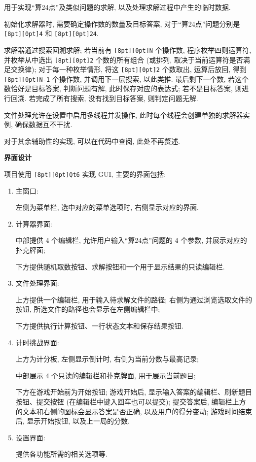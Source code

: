 \documentclass{ctexart}
\newcommand{\subtitletext}[1]{{\fontsize{16}{16} \textbf{#1} \vspace*{1ex}}}
\newcommand{\codebox}[1]{\colorbox[rgb]{0.9, 0.9, 0.9}{\texttt{\raisebox{0pt}[8pt][0pt]{#1}}}}
\begin{document}
\begin{enumerate}[itemindent=0pt, leftmargin=14pt]
    用于实现“算24点”及类似问题的求解, 以及处理求解过程中产生的临时数据.

    初始化求解器时, 需要确定操作数的数量及目标答案, 对于“算24点”问题分别是 \codebox{4} 和 \codebox{24}.

    求解器通过搜索回溯求解; 若当前有 \codebox{N} 个操作数, 程序枚举四则运算符, 
    并枚举从中选出 \codebox{2} 个数的所有组合 (或排列, 取决于当前运算符是否满足交换律);
    对于每一种枚举情形, 将这 \codebox{2} 个数取出, 运算后放回, 得到 \codebox{N-1} 个操作数,
    并调用下一层搜索, 以此类推. 最后剩下一个数, 若这个数恰好是目标答案, 判断问题有解, 此时保存对应的表达式; 若不是目标答案, 则进行回溯.
    若完成了所有搜索, 没有找到目标答案, 则判定问题无解.

    文件处理允许在设置中启用多线程并发操作, 此时每个线程会创建单独的求解器实例, 确保数据互不干扰.
    
    
\end{enumerate}

对于其余辅助性的实现, 可以在代码中查阅, 此处不再赘述.

\vspace*{4ex}

\subtitletext{界面设计}

项目使用 \codebox{Qt6} 实现 GUI, 主要的界面包括:

\begin{enumerate}[itemindent=0pt, leftmargin=14pt]

    \item 主窗口:
    
    左侧为菜单栏, 选中对应的菜单选项时, 右侧显示对应的界面.

    \item 计算器界面:
    
    中部提供 4 个编辑栏, 允许用户输入“算24点”问题的 4 个参数, 并展示对应的扑克牌面;

    下方提供随机取数按钮、求解按钮和一个用于显示结果的只读编辑栏.

    \item 文件处理界面:
    
    上方提供一个编辑栏, 用于输入待求解文件的路径; 右侧为通过浏览选取文件的按钮, 所选文件的路径也会显示在左侧编辑栏中;

    下方提供执行计算按钮、一行状态文本和保存结果按钮.

    \item 计时挑战界面:
    
    上方为计分板, 左侧显示倒计时, 右侧为当前分数与最高记录;

    中部展示 4 个只读的编辑栏和扑克牌面, 用于展示当前题目;

    下方在游戏开始前为开始按钮;
    游戏开始后, 显示输入答案的编辑栏、刷新题目按钮、提交按钮 (在编辑栏中键入回车也可以提交);
    提交答案后, 编辑栏上方的文本和右侧的图标会显示答案是否正确, 以及用户的得分变动;
    游戏时间结束后, 显示开始按钮, 以及上一局的分数.

    \item 设置界面:
    
    提供各功能所需的相关选项等.
    
\end{enumerate}
\end{document}
